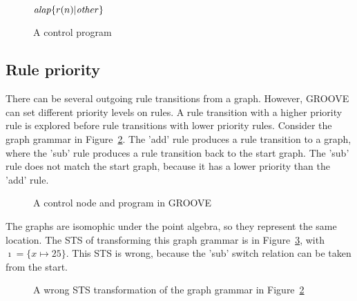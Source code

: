 \begin{figure}[ht]
  \begin{center}
$\mathit{alap} \{r(n) | \mathit{other}\}$
  \end{center}
  \caption{A control program}
  \label{fig:control_program}
\end{figure}

\subsection{Rule priority}
There can be several outgoing rule transitions from a graph. However, GROOVE can set different priority levels on rules. A rule transition with a higher priority rule is explored before rule transitions with lower priority rules. Consider the graph grammar in Figure~\ref{fig:priority_gg}. The 'add' rule produces a rule transition to a graph, where the 'sub' rule produces a rule transition back to the start graph. The 'sub' rule does not match the start graph, because it has a lower priority than the 'add' rule.

\begin{figure}[ht]
  \begin{center}
    \hspace{20px}
    \hspace{20px}
    \hspace{20px}
    \hspace{20px}
  \end{center}
  \caption{A control node and program in GROOVE}
  \label{fig:priority_gg}
\end{figure} 

The graphs are isomophic under the point algebra, so they represent the same location. The STS of transforming this graph grammar is in Figure~\ref{fig:priority_sts_wrong}, with $\imath = \{x \mapsto 25\}$. This STS is wrong, because the 'sub' switch relation can be taken from the start.

\begin{figure}[ht]
  \begin{center}
    
  \end{center}
  \caption{A wrong STS transformation of the graph grammar in Figure~\ref{fig:priority_gg}}
  \label{fig:priority_sts_wrong}
\end{figure}

